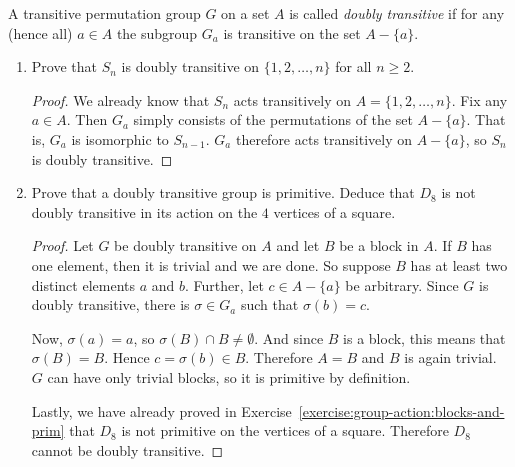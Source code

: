  A transitive permutation group $G$ on a set $A$ is called
{\em doubly transitive} if for any (hence all) $a\in A$ the subgroup
$G_a$ is transitive on the set $A - \{a\}$.
\begin{enumerate}
\item Prove that $S_n$ is doubly transitive on $\{1, 2, \dots, n\}$
  for all $n\geq2$.
  \begin{proof}
    We already know that $S_n$ acts transitively on
    $A = \{1,2,\dots,n\}$. Fix any $a\in A$. Then $G_a$ simply
    consists of the permutations of the set $A - \{a\}$. That is,
    $G_a$ is isomorphic to $S_{n-1}$. $G_a$ therefore acts
    transitively on $A - \{a\}$, so $S_n$ is doubly transitive.
  \end{proof}

\item Prove that a doubly transitive group is primitive. Deduce that
  $D_8$ is not doubly transitive in its action on the $4$ vertices of
  a square.
  \begin{proof}
    Let $G$ be doubly transitive on $A$ and let $B$ be a block in
    $A$. If $B$ has one element, then it is trivial and we are
    done. So suppose $B$ has at least two distinct elements $a$ and
    $b$. Further, let $c\in A - \{a\}$ be arbitrary. Since $G$ is
    doubly transitive, there is $\sigma\in G_a$ such that
    $\sigma(b) = c$.

    Now, $\sigma(a) = a$, so $\sigma(B)\cap B\neq\emptyset$. And since
    $B$ is a block, this means that $\sigma(B) = B$. Hence
    $c = \sigma(b)\in B$. Therefore $A = B$ and $B$ is again
    trivial. $G$ can have only trivial blocks, so it is primitive by
    definition.

    Lastly, we have already proved in
    Exercise~\ref{exercise:group-action:blocks-and-prim} that $D_8$ is
    not primitive on the vertices of a square. Therefore $D_8$ cannot
    be doubly transitive.
  \end{proof}
\end{enumerate}

